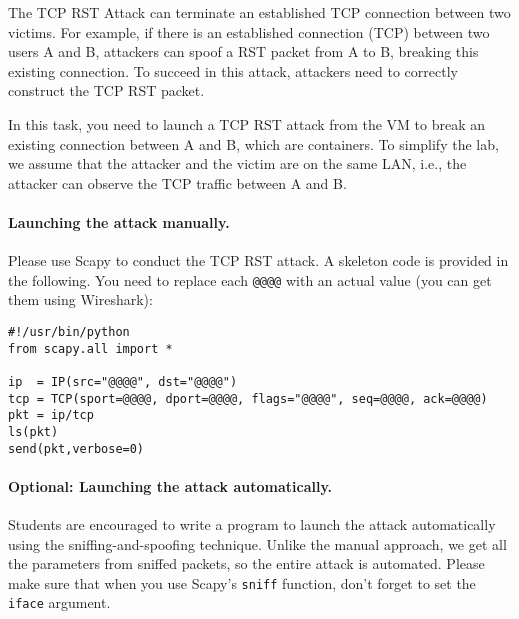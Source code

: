 The TCP RST Attack can terminate an established TCP connection between
two victims. For example, if there is an established \telnet connection (TCP)
between two users A and B, attackers can spoof a RST packet from A to B,
breaking this existing connection. To succeed in this attack, attackers
need to correctly construct the TCP RST packet. 

In this task, you need to launch a TCP RST attack from the VM 
to break an existing \telnet connection between A and B, which are 
containers.  To simplify the lab,
we assume that the attacker and the victim are on the same LAN,
i.e., the attacker can observe the TCP traffic between
A and B.


\paragraph{Launching the attack manually.} 
Please use Scapy to conduct the TCP RST attack. 
A skeleton code is provided in the following. You need to replace each
\texttt{@@@@} with an actual value (you can get them using Wireshark):  


\begin{lstlisting}
#!/usr/bin/python
from scapy.all import *

ip  = IP(src="@@@@", dst="@@@@")
tcp = TCP(sport=@@@@, dport=@@@@, flags="@@@@", seq=@@@@, ack=@@@@)
pkt = ip/tcp
ls(pkt)
send(pkt,verbose=0)
\end{lstlisting}

\paragraph{Optional: Launching the attack automatically.} 
Students are encouraged to write a program to launch the 
attack automatically using the sniffing-and-spoofing technique. 
Unlike the manual approach, we get all the parameters
from sniffed packets, so the entire attack is automated.  
Please make sure that when you 
use Scapy's \texttt{sniff} function, don't forget to 
set the \texttt{iface} argument.  

 

